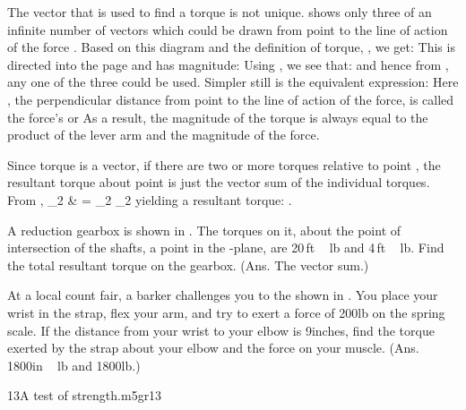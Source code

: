 {
The vector  that is used to find a torque is not unique.
 shows only three of an infinite number of  vectors which
could be drawn from point  to the line of action of the force .
Based on this diagram and the definition of torque, , we
get:
%
%
This \vect{\tau} is directed into the page and has magnitude:
%
%
Using , we see that:
%
%
and hence from , any one of the three could be used.
Simpler still is the equivalent expression:
%
%
Here \m{\ell}, the perpendicular distance from point  to the line of action
of the force, is called the force's  or 
As a result, the magnitude of the torque is always equal to the product of
the lever arm and the magnitude of the force.


Since torque is a vector, if there are two or more torques relative to point
, the resultant torque about
point  is just the vector sum of the individual torques.
From ,
%
          {\vect{\tau}_2 & = _2 \times {}_2}
%
yielding a resultant torque:
.\newline


\tryit A reduction gearbox is shown in .
The torques on it, about the point of intersection of the shafts, a point in
the -plane, are 20\,\unit{ft\,lb} and 4\,\unit{ft\,lb}.
Find the total resultant torque on the gearbox.
(Ans. The vector sum.)


\tryit At a local count fair, a barker challenges you to the  shown
in .
You place your wrist in the strap, flex your arm, and try to exert a force
of 200\unit{lb} on the spring scale.
If the distance from your wrist to your elbow is 9\unit{inches}, find the torque
exerted by the strap about your elbow and the force on your muscle.
(Ans. 1800\unit{in\,lb} and 1800\unit{lb}.)

%
                          {13}{A test of strength.}{m5gr13}
}%
%

